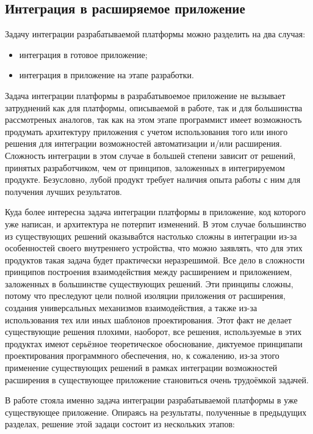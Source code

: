 \subsection{Интеграция в расширяемое приложение}
\label{sec:app-integration}

Задачу интеграции разрабатываемой платформы можно разделить на два случая:

\begin{itemize}
  \item интеграция в готовое приложение;
  \item интеграция в приложение на этапе разработки.
\end{itemize}

Задача интеграции платформы в разрабатывоемое приложение не вызывает затруднений как для платформы, описываемой в работе, так и для большинства рассмотреных аналогов, так как на этом этапе программист имеет возможность продумать архитектуру приложения с учетом использования того или иного решения для интеграции возможностей автоматизации и/или расширения. Сложность интеграции в этом случае в большей степени зависит от решений, принятых разработчиком, чем от принципов, заложенных в интегрируемом продукте. Безусловно, лубой продукт требует наличия опыта работы с ним для получения лучших результатов.

Куда более интересна задача интеграции платформы в приложение, код которого уже написан, и архитектура не потерпит изменений. В этом случае большинство из существующих решений оказывабтся настолько сложны в интеграции из-за особенностей своего внутреннего устройства, что можно заявлять, что для этих продуктов такая задача будет практически неразрешимой. Все дело в сложности принципов построения взаимодействия между расширением и приложением, заложенных в большинстве существующих решений. Эти принципы сложны, потому что преследуют цели полной изоляции приложения от расширения, создания универсальных механизмов взаимодействия, а также из-за использования тех или иных шаблонов проектирования. Этот факт не делает существующие решения плохими, наоборот, все решения, используемые в этих продуктах имеют серьёзное теоретическое обоснование, диктуемое принципапи проектирования программного обеспечения, но, к сожалению, из-за этого применение существующих решений в рамках интеграции возможностей расширения в существующее приложение становиться очень трудоёмкой задачей.

В работе стояла именно задача интеграции разрабатываемой платформы в уже существующее приложение. Опираясь на результаты, полученные в предыдущих разделах, решение этой задаци состоит из нескольких этапов:

